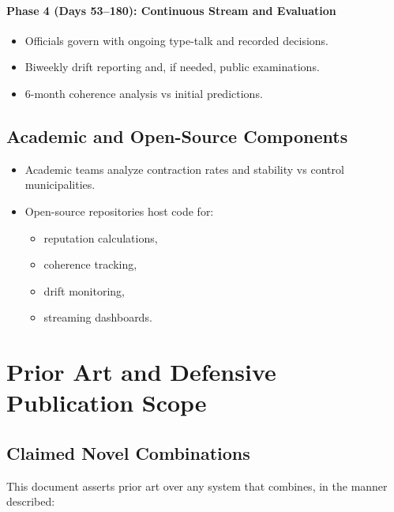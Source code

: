 \documentclass[11pt]{article}
\begin{document}
\paragraph{Phase 4 (Days 53--180): Continuous Stream and Evaluation}
\begin{itemize}[leftmargin=1.5em]
    \item Officials govern with ongoing type-talk and recorded decisions.
    \item Biweekly drift reporting and, if needed, public examinations.
    \item 6-month coherence analysis vs initial predictions.
\end{itemize}

\subsection{Academic and Open-Source Components}

\begin{itemize}[leftmargin=1.5em]
    \item Academic teams analyze contraction rates and stability vs control municipalities.
    \item Open-source repositories host code for:
    \begin{itemize}
        \item reputation calculations,
        \item coherence tracking,
        \item drift monitoring,
        \item streaming dashboards.
    \end{itemize}
\end{itemize}

\section{Prior Art and Defensive Publication Scope}

\subsection{Claimed Novel Combinations}

This document asserts prior art over any system that combines, in the manner described:
\end{document}
